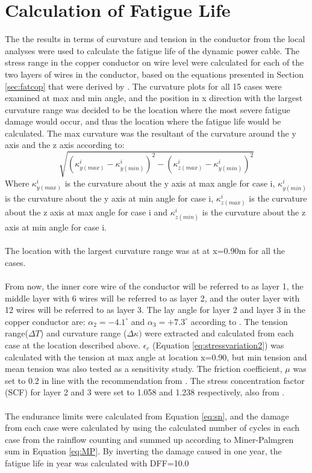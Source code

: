 \section{Calculation of Fatigue Life}
\label{sec:fatiguelife}
The the results in terms of curvature and tension in the conductor from the local analyses were used to calculate the fatigue life of the dynamic power cable. The stress range in the copper conductor on wire level were calculated for each of the two layers of wires in the conductor, based on the equations presented in Section \ref{sec:fatcop} that were derived by \cite{s300}. The curvature plots for all 15 cases were examined at max and min angle, and the position in x direction with the largest curvature range was decided to be the location where the most severe fatigue damage would occur, and thus the location where the fatigue life would be calculated. The max curvature was the resultant of the curvature around the y axis and the z axis according to:
\begin{equation}
\sqrt{(\kappa_{y(max)}^i-\kappa_{y(min)}^i)^2 - (\kappa_{z(max)}^i- \kappa_{y(min)}^i)^2}
\end{equation}
Where $\kappa_{y(max)}^i$ is the curvature about the y axis at max angle for case i, $\kappa_{y(min)}^i$ is the curvature about the y axis at min angle for case i, $\kappa_{z(max)}^i$ is the curvature about the z axis at max angle for case i and $\kappa_{z(min)}^i$ is the curvature about the z axis at min angle for case i. \\\\
The location with the largest curvature range was at at x=0.90m for all the cases. \\\\
From now, the inner core wire of the conductor will be referred to as layer 1, the middle layer with 6 wires will be referred to as layer 2, and the outer layer with 12 wires will be referred to as layer 3. The lay angle for layer 2 and layer 3 in the copper conductor are: $\alpha_2=-4.1^\circ$ and $\alpha_3=+7.3^\circ$ according to \cite{Nasution2013}. The tension range($\Delta T$) and curvature range ($\Delta \kappa)$ were extracted and calculated from each case at the location described above. $\epsilon_c$ (Equation \ref{eq:stressvariation2}) was calculated with the tension at max angle at location x=0.90, but min tension and mean tension was also tested as a sensitivity study. The friction coefficient, $\mu$ was set to 0.2 in line with the recommendation from \cite{NASUTION2014}. The stress concentration factor (SCF) for layer 2 and 3 were set to 1.058 and 1.238 respectively, also from \cite{NASUTION2014}. \\\\
The endurance limits were calculated from Equation \ref{eq:sn}, and the damage from each case were calculated by using the calculated number of cycles in each case from the rainflow counting and summed up according to Miner-Palmgren sum in Equation \ref{eq:MP}. By inverting the damage caused in one year, the fatigue life in year was calculated with DFF=10.0

